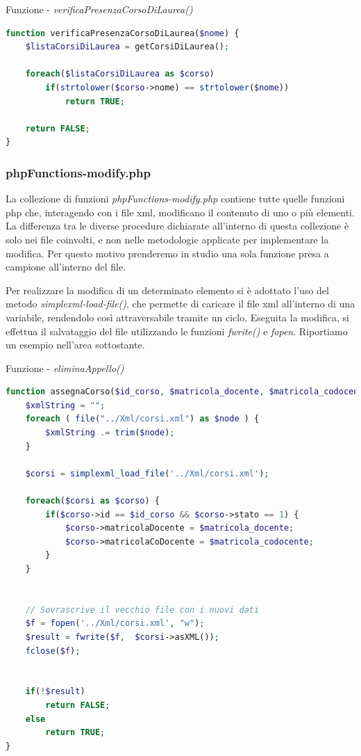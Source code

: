 \documentclass [a4paper,11pt]{book}
\begin{document}
\medskip

Funzione - \emph{verificaPresenzaCorsoDiLaurea()} 

\medskip

\begin{lstlisting}[language=PHP]
function verificaPresenzaCorsoDiLaurea($nome) {
    $listaCorsiDiLaurea = getCorsiDiLaurea();

    foreach($listaCorsiDiLaurea as $corso)
        if(strtolower($corso->nome) == strtolower($nome))
            return TRUE;
    
    return FALSE;
}

\end{lstlisting}

\medskip
\subsubsection{phpFunctions-modify.php}

La collezione di funzioni \emph{phpFunctions-modify.php} contiene tutte quelle funzioni php che, interagendo con i file xml, modificano il contenuto di uno o più elementi. La differenza tra le diverse procedure dichiarate all'interno di questa collezione è solo nei file coinvolti, e non nelle metodologie applicate per implementare la modifica. Per questo motivo prenderemo in studio una sola funzione presa a campione all'interno del file.

\medskip

Per realizzare la modifica di un determinato elemento si è adottato l'uso del metodo \emph{simplexml-load-file()}, che permette di caricare il file xml all'interno di una variabile, rendendolo così attraversabile tramite un ciclo. 
Eseguita la modifica, si effettua il salvataggio del file utilizzando le funzioni \emph{fwrite()} e \emph{fopen}. Riportiamo un esempio nell'area sottostante.

\medskip

Funzione - \emph{eliminaAppello()} 

\medskip

\begin{lstlisting}[language=PHP]
function assegnaCorso($id_corso, $matricola_docente, $matricola_codocente) {
    $xmlString = "";
    foreach ( file("../Xml/corsi.xml") as $node ) {
        $xmlString .= trim($node);
    }

    $corsi = simplexml_load_file('../Xml/corsi.xml');

    foreach($corsi as $corso) {
        if($corso->id == $id_corso && $corso->stato == 1) {
            $corso->matricolaDocente = $matricola_docente;
            $corso->matricolaCoDocente = $matricola_codocente;
        }
    }


    // Sovrascrive il vecchio file con i nuovi dati
    $f = fopen('../Xml/corsi.xml', "w");
    $result = fwrite($f,  $corsi->asXML());
    fclose($f);


    if(!$result) 
        return FALSE;
    else
        return TRUE;
}
\end{lstlisting}
\end{document}
